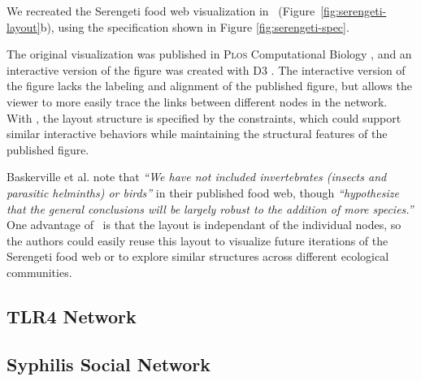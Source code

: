 We recreated the Serengeti food web visualization in \projectname~(Figure~\ref{fig:serengeti-layout}b), using the specification shown in Figure \ref{fig:serengeti-spec}.  

The original visualization was published in \textsc{Plos} Computational Biology \cite{baskerville2011spatial}, and an interactive version of the figure was created with D3 \cite{baskerville2011interactive}. The interactive version of the figure lacks the labeling and alignment of the published figure, but allows the viewer to more easily trace the links between different nodes in the network. With \projectname, the layout structure is specified by the constraints, which could support similar interactive behaviors while maintaining the structural features of the published figure.

Baskerville et al. note that \emph{``We have not included invertebrates (insects and parasitic helminths) or birds''} in their published food web, though \emph{``hypothesize that the general conclusions will be largely robust to the addition of more species.''} One advantage of \projectname~is that the layout is independant of the individual nodes, so the authors could easily reuse this layout to visualize future iterations of the Serengeti food web or to explore similar structures across different ecological communities.

\subsection{TLR4 Network}


\subsection{Syphilis Social Network}
\syphilisLayout
\syphilisSpec
{}


\subsection{}
